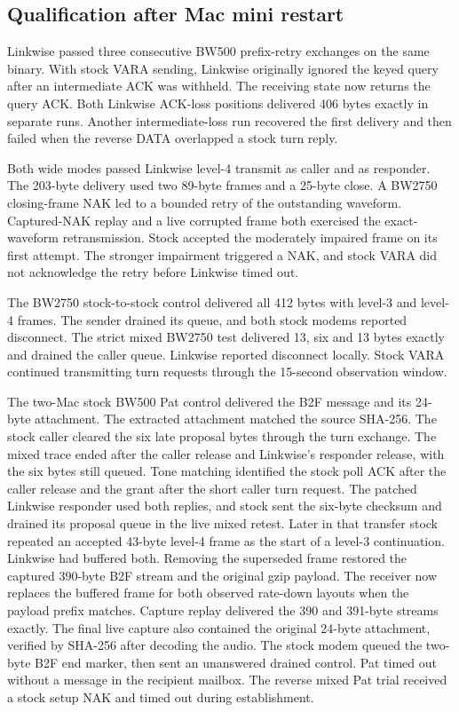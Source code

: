 \documentclass[11pt,a4paper]{article}
\begin{document}
\subsection{Qualification after Mac mini restart}

Linkwise passed three consecutive BW500 prefix-retry exchanges on the
same binary. With stock VARA sending, Linkwise originally ignored the
keyed query after an intermediate ACK was withheld. The receiving
state now returns the query ACK. Both Linkwise ACK-loss positions
delivered 406 bytes exactly in separate runs. Another intermediate-loss
run recovered the first delivery and then failed when the reverse DATA
overlapped a stock turn reply.

Both wide modes passed Linkwise level-4 transmit as caller and as
responder. The 203-byte delivery used two 89-byte frames and a
25-byte close. A BW2750 closing-frame NAK led to a bounded retry of
the outstanding waveform. Captured-NAK replay and a live corrupted
frame both exercised the exact-waveform retransmission. Stock
accepted the moderately impaired frame on its first attempt.
The stronger impairment triggered a NAK, and stock VARA did not
acknowledge the retry before Linkwise timed out.

The BW2750 stock-to-stock control delivered all 412 bytes with
level-3 and level-4 frames. The sender drained its queue, and both
stock modems reported disconnect.
The strict mixed BW2750 test delivered 13, six and 13 bytes exactly
and drained the caller queue. Linkwise reported disconnect locally.
Stock VARA continued transmitting turn requests through the
15-second observation window.

The two-Mac stock BW500 Pat control delivered the B2F message and
its 24-byte attachment. The extracted attachment matched the source
SHA-256. The stock caller cleared the six late proposal bytes through
the turn exchange. The mixed trace ended after the caller release
and Linkwise's responder release, with the six bytes still queued.
Tone matching identified the stock poll ACK after the caller release
and the grant after the short caller turn request. The patched
Linkwise responder used both replies, and stock sent the six-byte
checksum and drained its proposal queue in the live mixed retest.
Later in that transfer stock repeated an accepted 43-byte
level-4 frame as the start of a level-3 continuation. Linkwise had
buffered both. Removing the superseded frame restored the captured
390-byte B2F stream and the original gzip payload. The receiver
now replaces the buffered frame for both observed rate-down layouts
when the payload prefix matches. Capture replay delivered the 390
and 391-byte streams exactly. The final live capture also contained
the original 24-byte attachment, verified by SHA-256 after decoding
the audio. The stock modem queued the two-byte B2F end marker, then
sent an unanswered drained control. Pat timed out without a message
in the recipient mailbox. The reverse mixed Pat trial received a
stock setup NAK and timed out during establishment.
\end{document}

